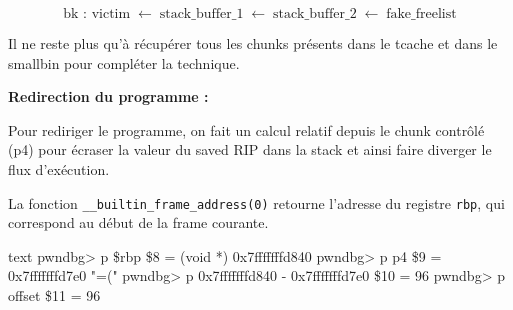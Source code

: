 \[
       \text{bk : } \text{victim} \;\leftarrow\; \text{stack\_buffer\_1} \;\leftarrow\;
       \text{stack\_buffer\_2} \;\leftarrow\; \text{fake\_freelist}
\]



Il ne reste plus qu’à récupérer tous les chunks présents dans le tcache et
dans le smallbin pour compléter la technique.



\textbf{Redirection du programme :}

Pour rediriger le programme, on fait un calcul relatif depuis le chunk contrôlé (p4)
pour écraser la valeur du saved RIP dans la stack et ainsi faire diverger le flux
d'exécution.


La fonction \texttt{\_\_builtin\_frame\_address(0)} retourne l’adresse du registre
\texttt{rbp}, qui correspond au début de la frame courante.

\begin{pwndbg}[heap]{text}
       pwndbg> p \$rbp
       \$8 = (void *) 0x7fffffffd840
       pwndbg> p p4
       \$9 = 0x7fffffffd7e0 "=("
       pwndbg> p 0x7fffffffd840 - 0x7fffffffd7e0
       \$10 = 96
       pwndbg> p offset
       \$11 = 96
\end{pwndbg}
